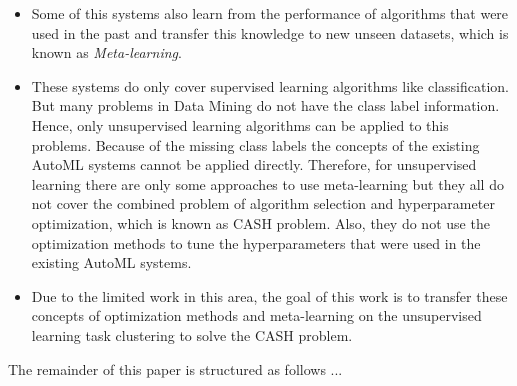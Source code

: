 \begin{itemize}
    \item Some of this systems also learn from the performance of algorithms that were used in the past and transfer this knowledge to new unseen datasets, which is known as \textit{Meta-learning}.
    \item These systems do only cover supervised learning algorithms like classification.
    But many problems in Data Mining do not have the class label information.
    Hence, only unsupervised learning algorithms can be applied to this problems.
    Because of the missing class labels the concepts of the existing \gls{AutoML} systems cannot be applied directly.
    Therefore, for unsupervised learning there are only some approaches to use meta-learning but they all do not cover the combined problem of algorithm selection and hyperparameter optimization, which is known as \gls{CASH} problem.
    Also, they do not use the optimization methods to tune the hyperparameters that were used in the existing AutoML systems.
    \item Due to the limited work in this area, the goal of this work is to transfer these concepts of optimization methods and meta-learning on the unsupervised learning task clustering to solve the \gls{CASH} problem.
\end{itemize}
 The remainder of this paper is structured as follows ...
